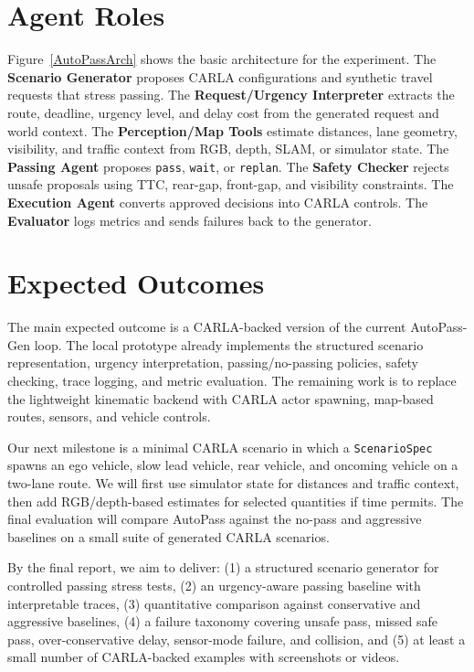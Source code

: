 \documentclass[10pt,twocolumn,letterpaper]{article}
\begin{document}
\section{Agent Roles}
Figure~\ref{AutoPassArch} shows the basic architecture for the experiment. The \textbf{Scenario Generator} proposes CARLA configurations and synthetic travel requests that stress passing. The \textbf{Request/Urgency Interpreter} extracts the route, deadline, urgency level, and delay cost from the generated request and world context. The \textbf{Perception/Map Tools} estimate distances, lane geometry, visibility, and traffic context from RGB, depth, SLAM, or simulator state. The \textbf{Passing Agent} proposes \texttt{pass}, \texttt{wait}, or \texttt{replan}. The \textbf{Safety Checker} rejects unsafe proposals using TTC, rear-gap, front-gap, and visibility constraints. The \textbf{Execution Agent} converts approved decisions into CARLA controls. The \textbf{Evaluator} logs metrics and sends failures back to the generator.

\section{Expected Outcomes}
The main expected outcome is a CARLA-backed version of the current AutoPass-Gen loop. The local prototype already implements the structured scenario representation, urgency interpretation, passing/no-passing policies, safety checking, trace logging, and metric evaluation. The remaining work is to replace the lightweight kinematic backend with CARLA actor spawning, map-based routes, sensors, and vehicle controls.

Our next milestone is a minimal CARLA scenario in which a \texttt{ScenarioSpec} spawns an ego vehicle, slow lead vehicle, rear vehicle, and oncoming vehicle on a two-lane route. We will first use simulator state for distances and traffic context, then add RGB/depth-based estimates for selected quantities if time permits. The final evaluation will compare AutoPass against the no-pass and aggressive baselines on a small suite of generated CARLA scenarios.

By the final report, we aim to deliver: (1) a structured scenario generator for controlled passing stress tests, (2) an urgency-aware passing baseline with interpretable traces, (3) quantitative comparison against conservative and aggressive baselines, (4) a failure taxonomy covering unsafe pass, missed safe pass, over-conservative delay, sensor-mode failure, and collision, and (5) at least a small number of CARLA-backed examples with screenshots or videos. 
\end{document}
